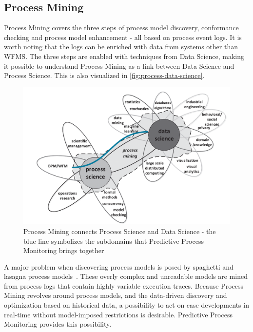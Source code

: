 \subsection{Process Mining}\label{sec:process-mining}
Process Mining covers the three steps of process model discovery, conformance checking and process model enhancement \cite{Aalst2016} -  all based on process event logs. It is worth noting that the logs can be enriched with data from systems other than WFMS. The three steps are enabled with techniques from Data Science, making it possible to understand Process Mining as a link between Data Science and Process Science. This is also visualized in \autoref{fig:process-data-science}.

\begin{figure}[!htb]
    \centering
    \includegraphics[width=.8\textwidth]{gfx/process-data-science.png}
    \caption[Process Mining connects two disciplines]{Process Mining connects Process Science and Data Science \cite[p.18]{Aalst2016} - the blue line symbolizes the subdomains that Predictive Process Monitoring brings together}
    \label{fig:process-data-science}
\end{figure}

A major problem when discovering process models is posed by spaghetti and lasagna process models~\cite{Aalst2016}. These overly complex and unreadable models are mined from process logs that contain highly variable execution traces. Because Process Mining revolves around process models, and the data-driven discovery and optimization based on historical data, a possibility to act on case developments in real-time without model-imposed restrictions is desirable. Predictive Process Monitoring provides this possibility.

\FloatBarrier
